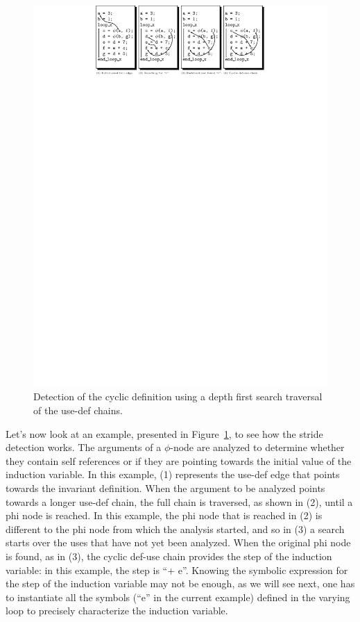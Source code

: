 \begin{figure}[h]
  \begin{center}
    \includegraphics[width=1.2\textwidth]{iv_step}
  \end{center}
  \vspace{-50em}
  \caption{Detection of the cyclic definition using a depth first
    search traversal of the use-def chains.}
  \label{spop:fig:ivstep}
\end{figure}

Let's now look at an example, presented in Figure~\ref{spop:fig:ivstep},
to see how the stride detection works.  The arguments of a $\phi$-node are
analyzed to determine whether they contain self references or if they
are pointing towards the initial value of the induction variable.  In
this example, (1) represents the use-def edge that points towards the
invariant definition.  When the argument to be analyzed points towards
a longer use-def chain, the full chain is traversed, as shown in (2),
until a phi node is reached.  In this example, the phi node that is
reached in (2) is different to the phi node from which the analysis
started, and so in (3) a search starts over the uses that have not yet
been analyzed.  When the original phi node is found, as in (3), the
cyclic def-use chain provides the step of the induction variable: in
this example, the step is ``+ e''.  Knowing the symbolic expression
for the step of the induction variable may not be enough, as we will
see next, one has to instantiate all the symbols (``e'' in the current
example) defined in the varying loop to precisely characterize the
induction variable.

